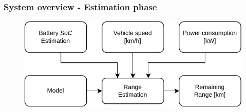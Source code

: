 \documentclass{beamer}
\begin{document}
\begin{frame}
	\frametitle{System overview - Estimation phase}
	\vspace{0.5cm}
	\begin{figure}[H]
		\begin{center}
			\includegraphics[scale=0.80]{./figures/report_generic_diagram_estimation_phase.pdf}
		\end{center}
	\end{figure}
	
\end{frame}
\end{document}

